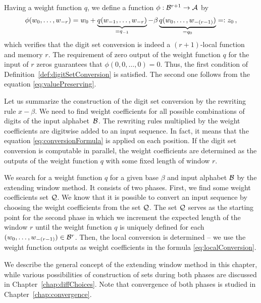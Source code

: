  Having a weight function $q$, we define a function $\phi:\mathcal{B}^{r+1}\rightarrow \mathcal{A}$ by
    \begin{equation}
    \label{eq:localConversion}
        \phi(w_{0}, \dots, w_{-r})=w_0+ \underbrace{q(w_{-1}, \dots, w_{-r})}_{=q_{-1}} - \beta \underbrace{q(w_{0}, \dots, w_{-(r-1)})}_{=q_0}=:z_0\,,
    \end{equation} 
    which verifies that the digit set conversion is indeed a $(r+1)$-local function and memory $r$. The requirement of zero output of the weight function $q$ for the input of $r$ zeros guarantees that $\phi(0,0,\dots,0)=0$. Thus, the first condition of Definition~\ref{def:digitSetConversion} is satisfied. The second one follows from the equation \eqref{eq:valuePreserving}. 
    
Let us summarize the construction of the digit set conversion by the rewriting rule \mbox{$x-\beta$}. We need to find weight coefficients for all possible combinations of digits of the input alphabet~$\mathcal{B}$. The rewriting rules multiplied by the weight coefficients are digitwise added to an input sequence. In fact, it means that the equation  \eqref{eq:conversionFormula} is applied on each position. If the digit set conversion is computable in parallel, the weight coefficients are determined as the outputs of the weight function $q$ with some fixed length of window $r$.  

We search for a weight function $q$ for a given base $\beta$ and input alphabet $\mathcal{B}$ by the extending window method. It consists of two phases. First, we find some weight coefficients set $\mathcal{Q}$. We know that it is possible to convert an input sequence by choosing the weight coefficients from the set $\mathcal{Q}$. The set $\mathcal{Q}$ serves as the starting point for the second phase in which we increment the expected length of the window $r$ until the weight function $q$ is uniquely defined for each $(w_{0}, \dots, w_{-(r-1)}) \in \mathcal{B}^{r}$. Then, the local conversion is determined -- we use the weight function outputs as weight coefficients in the formula \eqref{eq:localConversion}.    

We describe the general concept of the extending window method in this chapter, while various possibilities of construction of sets during both phases are discussed in Chapter~\ref{chap:diffChoices}.
Note that  convergence of both phases is studied in Chapter~\ref{chap:convergence}.
      
